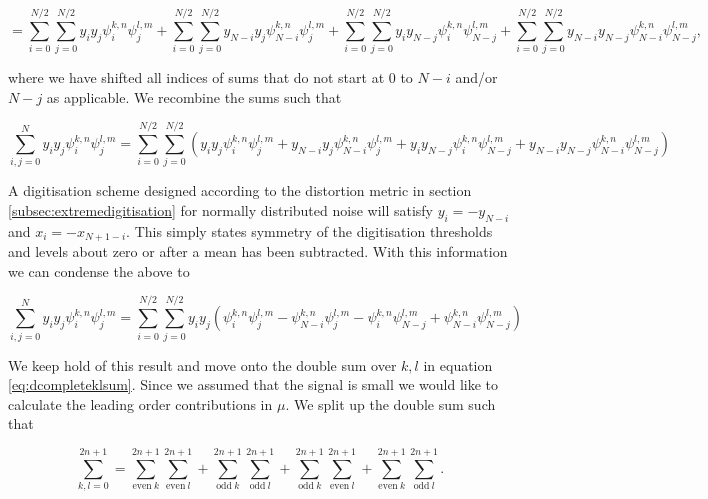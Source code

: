 \documentclass[apj]{emulateapj}
\begin{document}
\begin{equation}
 = \sum_{i = 0}^{N/2}\sum_{j = 0}^{N/2} y_i y_j \psi_i^{k, n} \psi_j^{l, m} + \sum_{i = 0}^{N/2}\sum_{j = 0}^{N/2} y_{N-i} y_j \psi_{N-i}^{k, n} \psi_j^{l, m} + \sum_{i = 0}^{N/2}\sum_{j = 0}^{N/2} y_i y_{N-j} \psi_i^{k, n} \psi_{N-j}^{l, m} + \sum_{i = 0}^{N/2}\sum_{j = 0}^{N/2} y_{N-i} y_{N-j} \psi_{N-i}^{k, n} \psi_{N-j}^{l, m},
\end{equation}

where we have shifted all indices of sums that do not start at $0$ to $N-i$ and/or $N-j$ as applicable. We recombine the sums such that

\begin{equation}
\sum_{i,j = 0}^N y_i y_j \psi_i^{k, n} \psi_j^{l, m} = \sum_{i = 0}^{N/2}\sum_{j = 0}^{N/2} \left( y_i y_j \psi_i^{k, n} \psi_j^{l, m} +  y_{N-i} y_j \psi_{N-i}^{k, n} \psi_j^{l, m} + y_i y_{N-j} \psi_i^{k, n} \psi_{N-j}^{l, m} + y_{N-i} y_{N-j} \psi_{N-i}^{k, n} \psi_{N-j}^{l, m} \right)
\end{equation}

A digitisation scheme designed according to the distortion metric in section \ref{subsec:extremedigitisation} for normally distributed noise will satisfy $y_i = -y_{N-i}$ and $x_i = -x_{N+1-i}$.  This simply states symmetry of the digitisation thresholds and levels about zero or after a mean has been subtracted. With this information we can condense the above to

\begin{equation} \label{eq:ijsum}
\sum_{i,j = 0}^N y_i y_j \psi_i^{k, n} \psi_j^{l, m} = \sum_{i = 0}^{N/2}\sum_{j = 0}^{N/2} y_i y_j \left( \psi_i^{k, n} \psi_j^{l, m} - \psi_{N-i}^{k, n} \psi_j^{l, m} - \psi_i^{k, n} \psi_{N-j}^{l, m} + \psi_{N-i}^{k, n} \psi_{N-j}^{l, m} \right)
\end{equation}

We keep hold of this result and move onto the double sum over $k,l$ in equation \ref{eq:dcompleteklsum}. Since we assumed that the signal is small we would like to calculate the leading order contributions in $\mu$. We split up the double sum such that

\begin{equation} \label{eq:ksums}
\sum_{k, l = 0}^{2n+1} = \sum_{\mathrm{even} \> k}^{2n+1} \sum_{\mathrm{even} \> l}^{2n+1}  + \sum_{\mathrm{odd} \> k}^{2n+1} \sum_{\mathrm{odd} \> l}^{2n+1} + \sum_{\mathrm{odd} \> k}^{2n+1} \sum_{\mathrm{even} \> l}^{2n+1}  + \sum_{\mathrm{even} \> k}^{2n+1} \sum_{\mathrm{odd} \> l}^{2n+1}.
\end{equation}
\end{document}
